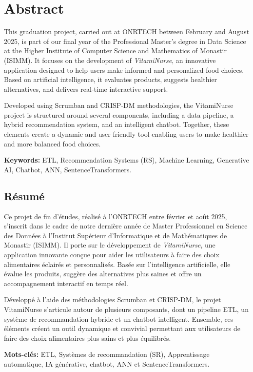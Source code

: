 \chapter*{Abstract}

This graduation project, carried out at ONRTECH between February and August 2025, is part of our final year of the Professional Master’s degree in Data Science at the Higher Institute of Computer Science and Mathematics of Monastir (ISIMM). It focuses on the development of \textit{VitamiNurse}, an innovative application designed to help users make informed and personalized food choices. Based on artificial intelligence, it evaluates products, suggests healthier alternatives, and delivers real-time interactive support.

Developed using Scrumban and CRISP-DM methodologies, the VitamiNurse project is structured around several components, including a data pipeline, a hybrid recommendation system, and an intelligent chatbot. Together, these elements create a dynamic and user-friendly tool enabling users to make healthier and more balanced food choices.

\noindent\textbf{Keywords:} ETL, Recommendation Systems (RS), Machine Learning, Generative AI, Chatbot, ANN, SentenceTransformers.

\section*{Résumé}
Ce projet de fin d’études, réalisé à l’ONRTECH entre février et août 2025, s’inscrit dans le cadre de notre dernière année de Master Professionnel en Science des Données à l’Institut Supérieur d’Informatique et de Mathématiques de Monastir (ISIMM). Il porte sur le développement de \textit{VitamiNurse}, une application innovante conçue pour aider les utilisateurs à faire des choix alimentaires éclairés et personnalisés. Basée sur l’intelligence artificielle, elle évalue les produits, suggère des alternatives plus saines et offre un accompagnement interactif en temps réel.

Développé à l’aide des méthodologies Scrumban et CRISP-DM, le projet VitamiNurse s’articule autour de plusieurs composants, dont un pipeline ETL, un système de recommandation hybride et un chatbot intelligent. Ensemble, ces éléments créent un outil dynamique et convivial permettant aux utilisateurs de faire des choix alimentaires plus sains et plus équilibrés.

\noindent\textbf{Mots-clés:} ETL, Systèmes de recommandation (SR), Apprentissage automatique, IA générative, chatbot, ANN et SentenceTransformers.